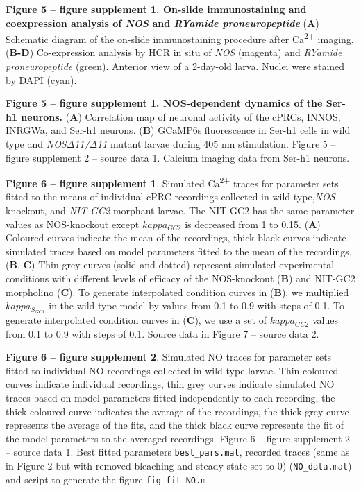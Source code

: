\documentclass[
  11pt,
  letterpaper,
  DIV=11,
  numbers=noendperiod]{scrartcl}
\begin{document}
\textbf{Figure 5 -- figure supplement 1. On-slide immunostaining and
coexpression analysis of \emph{NOS} and \emph{RYamide proneuropeptide} }
(\textbf{A}) Schematic diagram of the on-slide immunostaining procedure
after Ca\textsuperscript{2+} imaging.(\textbf{B-D}) Co-expression
analysis by HCR in situ of \emph{NOS} (magenta) and \emph{RYamide
proneuropeptide} (green). Anterior view of a 2-day-old larva. Nuclei
were stained by DAPI (cyan).

\textbf{Figure 5 -- figure supplement 1. NOS-dependent dynamics of the
Ser-h1 neurons.} (\textbf{A}) Correlation map of neuronal activity of
the cPRCs, INNOS, INRGWa, and Ser-h1 neurons. (\textbf{B}) GCaMP6s
fluorescence in Ser-h1 cells in wild type and \emph{NOSΔ11/Δ11} mutant
larvae during 405 nm stimulation. Figure 5 -- figure supplement 2 --
source data 1. Calcium imaging data from Ser-h1 neurons.

\textbf{Figure 6 -- figure supplement 1}. Simulated
Ca\textsuperscript{2+} traces for parameter sets fitted to the means of
individual cPRC recordings collected in wild-type,\emph{NOS} knockout,
and \emph{NIT-GC2} morphant larvae. The NIT-GC2 has the same parameter
values as NOS-knockout except \(kappa_{GC2}\) is decreased from 1 to
0.15. (\textbf{A}) Coloured curves indicate the mean of the recordings,
thick black curves indicate simulated traces based on model parameters
fitted to the mean of the recordings. (\textbf{B}, \textbf{C}) Thin grey
curves (solid and dotted) represent simulated experimental conditions
with different levels of efficacy of the NOS-knockout (\textbf{B}) and
NIT-GC2 morpholino (\textbf{C}). To generate interpolated condition
curves in (\textbf{B}), we multiplied \(kappa_{S_{GC1}}\) in the
wild-type model by values from 0.1 to 0.9 with steps of 0.1. To generate
interpolated condition curves in (\textbf{C}), we use a set of
\(kappa_{GC2}\) values from 0.1 to 0.9 with steps of 0.1. Source data in
Figure 7 -- source data 2.

\textbf{Figure 6 -- figure supplement 2}. Simulated NO traces for
parameter sets fitted to individual NO-recordings collected in wild type
larvae. Thin coloured curves indicate individual recordings, thin grey
curves indicate simulated NO traces based on model parameters fitted
independently to each recording, the thick coloured curve indicates the
average of the recordings, the thick grey curve represents the average
of the fits, and the thick black curve represents the fit of the model
parameters to the averaged recordings. Figure 6 -- figure supplement 2
-- source data 1. Best fitted parameters \texttt{best\_pars.mat},
recorded traces (same as in Figure 2 but with removed bleaching and
steady state set to 0) (\texttt{NO\_data.mat}) and script to generate
the figure \texttt{fig\_fit\_NO.m}
\end{document}

